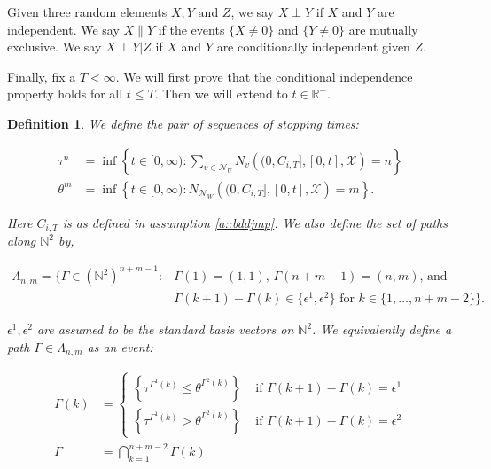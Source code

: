 \documentclass[12pt]{article}
\newcommand{\mb}{\mathbb}
\newcommand{\mc}{\mathcal}
\newcommand{\te}{\text}
\newcommand{\ep}{\epsilon}
\newcommand{\ind}{\hspace{24pt}}
\newcommand{\sta}{\mc{X}}							%
\newcommand{\neigh}[1]{\mc{N}_{#1}}					%
\newcommand{\indx}[1]{^{#1}}						%
\newcommand{\Xf}{X}									%
\newcommand{\poiss}{N}								%
\newcommand{\poissv}[1]{_{#1}}						%
\newcommand{\jumpibd}[2]{C_{#1,#2}}					%
\newcommand{\seto}{U}								%
\newcommand{\sett}{W}								%
\newcommand{\mutex}{\|}								%
\newcommand{\rtt}{\theta}							%
\newcommand{\apath}{\Gamma}						%
\newcommand{\pathset}[2]{\Lambda_{#1,#2}}		%
\newcommand{\indo}{n}							%
\newcommand{\indt}{m}							%
\newcommand{\Xg}{Y}									%
\newcommand{\rt}{\tau}								%
\newcommand{\ev}[1]{\ep^{#1}}						%
\newcommand{\Xh}{Z}									%
\newtheorem{defn}[thms]{Definition}
\begin{document}
\ind Given three random elements \(\Xf,\Xg \te{ and } \Xh\), we say \(\Xf\perp \Xg\) if \(\Xf\) and \(\Xg\) are independent. We say \(\Xf\mutex \Xg\) if the events \(\{\Xf\neq 0\}\) and \(\{\Xg \neq 0\}\) are mutually exclusive. We say \(\Xf\perp \Xg|\Xh\) if \(\Xf\) and \(\Xg\) are conditionally independent given \(\Xh\).

\ind Finally, fix a \(T < \infty\). We will first prove that the conditional independence property holds for all \(t \leq T\). Then we will extend to \(t \in \mb{R}^+\).

\begin{defn}
We define the pair of sequences of stopping times:

\begin{align*}
\rt\indx{\indo} &= \inf \left\{t \in [0,\infty): \sum_{v \in \neigh{\seto}}\poiss\poissv{v}\left((0,\jumpibd{i}{T}],[0,t],\sta \right) = \indo\right\}\\
\rtt\indx{\indt} &= \inf \left\{t \in [0,\infty): \poiss\poissv{\neigh{\sett}}\left((0,\jumpibd{i}{T}],[0,t],\sta \right) = \indt\right\}.
\end{align*}

Here \(\jumpibd{i}{T}\) is as defined in assumption \ref{a::bddjmp}. We also define the set of paths along \(\mb{N}^2\) by,

\begin{align}
\pathset{\indo}{\indt} = \{\apath \in (\mb{N}^2)^{\indo+\indt-1}: &\apath(1) = (1,1)\te{, } \apath(\indo+\indt-1) = (\indo,\indt)\te{, and } \nonumber\\
&\apath(k+1) - \apath(k)\in \{\ev{1},\ev{2}\}\te{ for }k\in \{1,\dots, \indo+\indt-2\}\}.
\label{CIpf::Lambda}
\end{align}

\(\ev{1},\ev{2}\) are assumed to be the standard basis vectors on \(\mb{N}^2\). We equivalently define a path \(\apath \in \pathset{\indo}{\indt}\) as an event:

\begin{align}
\apath(k) &= \begin{cases}
\left\{\rt\indx{\apath\indx{1}(k)} \leq \rtt\indx{\apath\indx{2}(k)}\right\} &\te{ if } \apath(k+1) - \apath(k) = \ev{1}\\
\left\{\rt\indx{\apath\indx{1}(k)} > \rtt\indx{\apath\indx{2}(k)}\right\} &\te{ if } \apath(k+1) - \apath(k) = \ev{2}
\end{cases}\\
\apath &= \bigcap_{k=1}^{\indo+\indt-2} \apath(k)
\label{CIpf::Gamma}
\end{align}
\label{CIpf::GammaLambda}
\end{defn}
\end{document}
